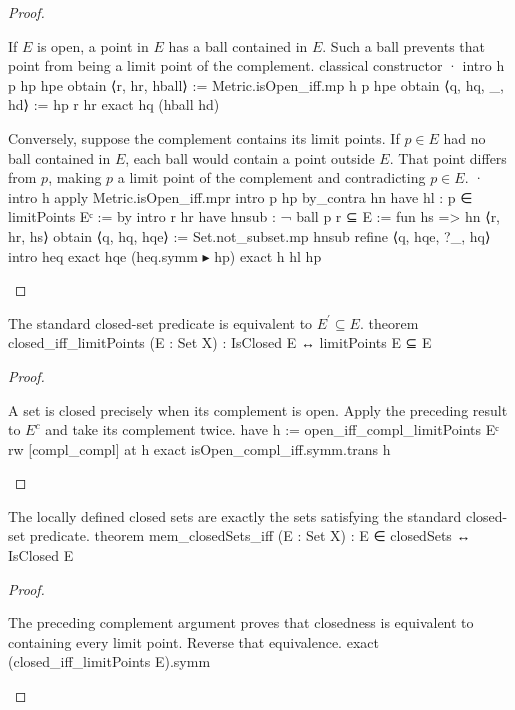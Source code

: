 \begin{proof}
  \begin{lean}{If $E$ is open, a point in $E$ has a ball contained in $E$. Such a ball prevents that point from being a limit point of the complement.}
    classical
    constructor
    · intro h p hp hpe
      obtain ⟨r, hr, hball⟩ := Metric.isOpen_iff.mp h p hpe
      obtain ⟨q, hq, _, hd⟩ := hp r hr
      exact hq (hball hd)
  \end{lean}

  \begin{lean}{Conversely, suppose the complement contains its limit points. If $p\in E$ had no ball contained in $E$, each ball would contain a point outside $E$. That point differs from $p$, making $p$ a limit point of the complement and contradicting $p\in E$.}
    · intro h
      apply Metric.isOpen_iff.mpr
      intro p hp
      by_contra hn
      have hl : p ∈ limitPoints Eᶜ := by
        intro r hr
        have hnsub : ¬ ball p r ⊆ E := fun hs => hn ⟨r, hr, hs⟩
        obtain ⟨q, hq, hqe⟩ := Set.not_subset.mp hnsub
        refine ⟨q, hqe, ?_, hq⟩
        intro heq
        exact hqe (heq.symm ▸ hp)
      exact h hl hp
  \end{lean}

\end{proof}

\begin{lemma} \label{an1:lem:closed-iff-limitPoints}
  \begin{lean}{The standard closed-set predicate is equivalent to $E^{\prime}\subseteq E$.}
    theorem closed_iff_limitPoints (E : Set X) :
        IsClosed E ↔ limitPoints E ⊆ E
  \end{lean}
\end{lemma}

\begin{proof}
  \begin{lean}{A set is closed precisely when its complement is open. Apply the preceding result to $E^{c}$ and take its complement twice.}
    have h := open_iff_compl_limitPoints Eᶜ
    rw [compl_compl] at h
    exact isOpen_compl_iff.symm.trans h
  \end{lean}

\end{proof}

\begin{lemma} \label{an1:lem:mem-closedSets-iff}
  \begin{lean}{The locally defined closed sets are exactly the sets satisfying the standard closed-set predicate.}
    theorem mem_closedSets_iff (E : Set X) : E ∈ closedSets ↔ IsClosed E
  \end{lean}
\end{lemma}

\begin{proof}
  \begin{lean}{The preceding complement argument proves that closedness is equivalent to containing every limit point. Reverse that equivalence.}
    exact (closed_iff_limitPoints E).symm
  \end{lean}

\end{proof}
